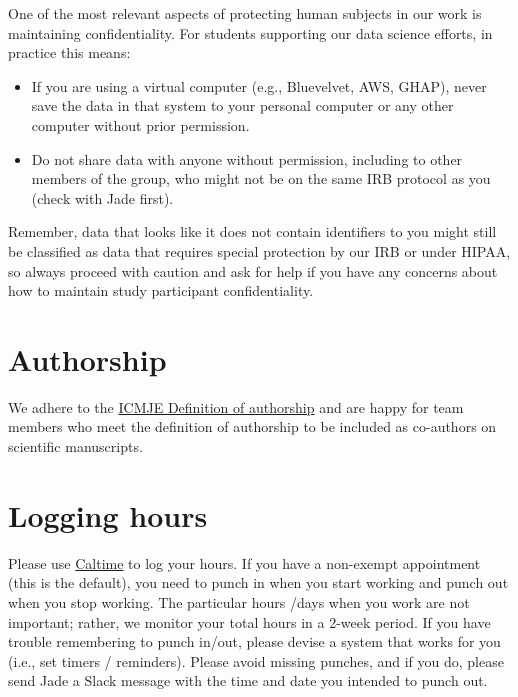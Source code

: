 \documentclass[]{book}
\providecommand{\tightlist}{%
  \setlength{\itemsep}{0pt}\setlength{\parskip}{0pt}}
\begin{document}
One of the most relevant aspects of protecting human subjects in our
work is maintaining confidentiality. For students supporting our data
science efforts, in practice this means:

\begin{itemize}
\tightlist
\item
  If you are using a virtual computer (e.g., Bluevelvet, AWS, GHAP),
  never save the data in that system to your personal computer or any
  other computer without prior permission.
\item
  Do not share data with anyone without permission, including to other
  members of the group, who might not be on the same IRB protocol as you
  (check with Jade first).
\end{itemize}

Remember, data that looks like it does not contain identifiers to you
might still be classified as data that requires special protection by
our IRB or under HIPAA, so always proceed with caution and ask for help
if you have any concerns about how to maintain study participant
confidentiality.

\section{Authorship}\label{authorship}

We adhere to the
\href{http://www.icmje.org/recommendations/browse/roles-and-responsibilities/defining-the-role-of-authors-and-contributors.html}{ICMJE
Definition of authorship} and are happy for team members who meet the
definition of authorship to be included as co-authors on scientific
manuscripts.

\section{Logging hours}\label{logging-hours}

Please use \href{caltime.berkeley.edu}{Caltime} to log your hours. If
you have a non-exempt appointment (this is the default), you need to
punch in when you start working and punch out when you stop working. The
particular hours /days when you work are not important; rather, we
monitor your total hours in a 2-week period. If you have trouble
remembering to punch in/out, please devise a system that works for you
(i.e., set timers / reminders). Please avoid missing punches, and if you
do, please send Jade a Slack message with the time and date you intended
to punch out.
\end{document}
